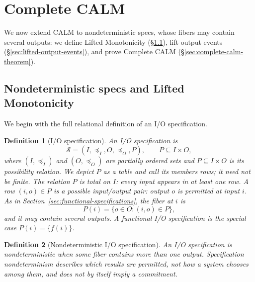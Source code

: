 \documentclass[sigconf]{cidr-2027}
\newtheorem{definition}{Definition}
\theoremstyle{remark}
\newcommand{\InputOrd}{\preceq_I}
\newcommand{\OutputOrd}{\preceq_O}
\newcommand{\commitment}{commitment\xspace}
\newcommand{\Spec}{\mathcal{S}}
\newcommand{\spectype}[1][]{I/O specification#1\xspace}
\newcommand{\Spectype}[1][]{I/O specification#1\xspace}
\newcommand{\fiber}[1]{P(#1)}
\begin{document}
\section{Complete CALM}
\label{sec:complete-calm}

\textcolor{reviewed}{We now extend CALM to nondeterministic specs, whose fibers may contain several outputs: we define Lifted Monotonicity (\S\ref{sec:relational-specifications}), lift output events (\S\ref{sec:lifted-output-events}), and prove Complete CALM (\S\ref{sec:complete-calm-theorem}).}

\subsection{Nondeterministic specs and Lifted Monotonicity}
\label{sec:relational-specifications}

We begin with the full relational definition of an \spectype.
\begin{definition}[\Spectype]
\label{def:relational-specification}
\textcolor{reviewed}{An \emph{\spectype} is}
        \begin{equation}
  \Spec=(I,\InputOrd,O,\OutputOrd,P),
  \qquad P\subseteq I\times O,
  \label{eq:relational-specification}
        \end{equation}
where $(I,\InputOrd)$ and $(O,\OutputOrd)$ are partially ordered sets and
  $P\subseteq I\times O$ is its \emph{possibility relation}. We depict $P$ as
a table and call its members rows; it need not be finite. The relation $P$
  is total on $I$: every input appears in at least one row. \textcolor{reviewed}{A row $(i,o)\in P$
  is a possible input/output pair: output $o$ is permitted at input $i$.} As in
  Section~\ref{sec:functional-specifications}, the fiber at $i$ is
        \begin{equation}
  \fiber{i}=\{o\in O:(i,o)\in P\},
  \label{eq:fiber}
        \end{equation}
and it may contain several outputs. \textcolor{reviewed}{A functional \spectype is the special
  case $\fiber{i}=\{f(i)\}$.}
\end{definition}

\begin{definition}[Nondeterministic \spectype]
\label{def:nondeterministic}
An \spectype is \emph{nondeterministic} when some fiber
contains more than one output. \textcolor{reviewed}{Specification nondeterminism describes
which results are permitted, not how a system chooses among them, and does not
by itself imply a \commitment.}
\end{definition}
\end{document}
